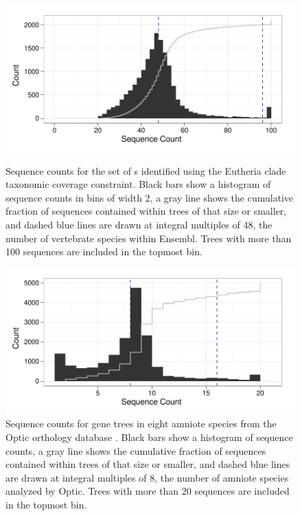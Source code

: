 \begin{figure}
\centering
\includegraphics[scale=0.8]{Figs/ensembl_euth_hist.pdf}
\caption{Sequence counts for the set of \subtr{}s identified using the
  Eutheria clade taxonomic coverage constraint. Black bars show a
  histogram of sequence counts in bins of width 2, a gray line shows
  the cumulative fraction of sequences contained within trees of that
  size or smaller, and dashed blue lines are drawn at integral
  multiples of 48, the number of vertebrate species within
  Ensembl. Trees with more than 100 sequences are included in the
  topmost bin.}
\label{ensembl_euth_hist}

\hspace{.2in}

\includegraphics[scale=0.8]{Figs/optic_roots_hist.pdf}
\caption{Sequence counts for gene trees in eight amniote species from
  the Optic orthology database \citep{Heger2008}. Black bars show a
  histogram of sequence counts, a gray line shows the cumulative
  fraction of sequences contained within trees of that size or
  smaller, and dashed blue lines are drawn at integral multiples of 8,
  the number of amniote species analyzed by Optic. Trees with more
  than 20 sequences are included in the topmost bin.}
\label{optic_roots_hist}
\end{figure}

